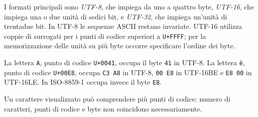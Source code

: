 I formati principali sono \emph{UTF-8}, che impiega da uno a quattro
byte, \emph{UTF-16}, che impiega una o due unità di sedici bit, e
\emph{UTF-32}, che impiega un'unità di trentadue bit. In UTF-8
le sequenze ASCII restano invariate. UTF-16 utilizza coppie di
surrogati per i punti di codice superiori a \texttt{U+FFFF};
per la memorizzazione delle unità su più byte occorre specificare
l'ordine dei byte.

\begin{example}
La lettera \texttt{A}, punto di codice \texttt{U+0041}, occupa
il byte \texttt{41} in UTF-8. La lettera \texttt{è}, punto di
codice \texttt{U+00E8}, occupa \texttt{C3 A8} in UTF-8,
\texttt{00 E8} in UTF-16BE e \texttt{E8 00} in UTF-16LE.
In ISO-8859-1 occupa invece il byte \texttt{E8}.
\end{example}

Un carattere visualizzato può comprendere più punti di codice:
numero di caratteri, punti di codice e byte non coincidono
necessariamente.
